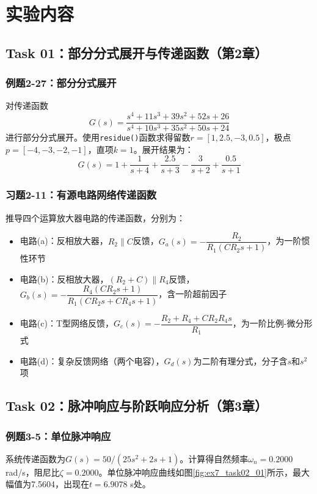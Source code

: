 \documentclass{../common/SCNU_Experimental_Report}
\begin{document}
\section{实验内容}
\subsection{Task 01：部分分式展开与传递函数（第2章）}

\subsubsection{例题2-27：部分分式展开}
对传递函数
\[
G(s) = \frac{s^4 + 11s^3 + 39s^2 + 52s + 26}{s^4 + 10s^3 + 35s^2 + 50s + 24}
\]
进行部分分式展开。使用\texttt{residue()}函数求得留数$r = [1, 2.5, -3, 0.5]$，极点$p = [-4, -3, -2, -1]$，直项$k = 1$。展开结果为：
\[
G(s) = 1 + \frac{1}{s+4} + \frac{2.5}{s+3} - \frac{3}{s+2} + \frac{0.5}{s+1}
\]

\subsubsection{习题2-11：有源电路网络传递函数}
推导四个运算放大器电路的传递函数，分别为：
\begin{itemize}
    \item 电路(a)：反相放大器，$R_2\|C$反馈，$G_a(s) = -\dfrac{R_2}{R_1(CR_2s+1)}$，为一阶惯性环节
    \item 电路(b)：反相放大器，$(R_2+C)\|R_4$反馈，$G_b(s) = -\dfrac{R_4(CR_2s+1)}{R_1(CR_2s+CR_4s+1)}$，含一阶超前因子
    \item 电路(c)：T型网络反馈，$G_c(s) = -\dfrac{R_2+R_4+CR_2R_4s}{R_1}$，为一阶比例-微分形式
    \item 电路(d)：复杂反馈网络（两个电容），$G_d(s)$为二阶有理分式，分子含$s$和$s^2$项
\end{itemize}

\subsection{Task 02：脉冲响应与阶跃响应分析（第3章）}

\subsubsection{例题3-5：单位脉冲响应}
系统传递函数为$G(s) = 50/(25s^2+2s+1)$。计算得自然频率$\omega_n = 0.2000$ rad/s，阻尼比$\zeta = 0.2000$。单位脉冲响应曲线如图\ref{fig:ex7_task02_01}所示，最大幅值为7.5604，出现在$t=6.9078$ s处。
\end{document}

